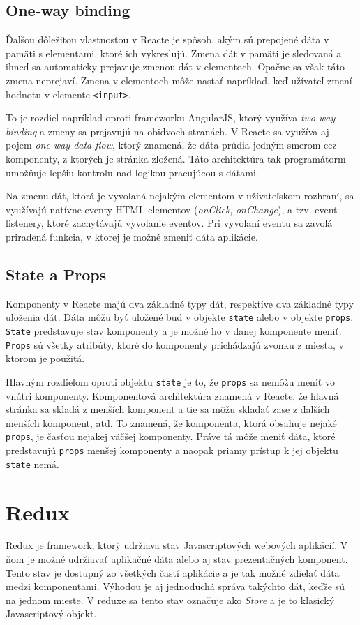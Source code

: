 \documentclass[
  digital, %
  table,   %
  lof,     %
  lot,     %
]{fithesis3}
\begin{document}
\subsection{One-way binding}
Ďalšou dôležitou vlastnosťou v Reacte je spôsob, akým sú prepojené dáta v pamäti s elementami, ktoré ich vykreslujú. Zmena dát v pamäti je sledovaná a ihneď sa automaticky prejavuje zmenou dát v elementoch. Opačne sa však táto zmena neprejaví. Zmena v elementoch môže nastať napríklad, keď užívateľ zmení hodnotu v elemente \texttt{<input>}.

To je rozdiel napríklad oproti frameworku AngularJS, ktorý využíva \textit{two-way binding} a zmeny sa prejavujú na obidvoch stranách. V Reacte sa využíva aj pojem \textit{one-way data flow}, ktorý znamená, že dáta prúdia jedným smerom cez komponenty, z ktorých je stránka zložená. Táto architektúra tak programátorm umožňuje lepšiu kontrolu nad logikou pracujúcou s dátami.

Na zmenu dát, ktorá je vyvolaná nejakým elementom v užívateľskom rozhraní, sa využívajú natívne eventy HTML elementov (\textit{onClick}, \textit{onChange}), a tzv. event-listenery, ktoré zachytávajú vyvolanie eventov. Pri vyvolaní eventu sa zavolá priradená funkcia, v ktorej je možné zmeniť dáta aplikácie.

\subsection{State a Props}
Komponenty v Reacte majú dva základné typy dát, respektíve dva základné typy uloženia dát. Dáta môžu byť uložené bud v objekte \texttt{state} alebo v objekte \texttt{props}. \texttt{State} predstavuje stav komponenty a je možné ho v danej komponente meniť. \texttt{Props} sú všetky atribúty, ktoré do komponenty prichádzajú zvonku z miesta, v ktorom je použitá.

Hlavným rozdielom oproti objektu \texttt{state} je to, že \texttt{props} sa nemôžu meniť vo vnútri komponenty. Komponentová architektúra znamená v Reacte, že hlavná stránka sa skladá z menších komponent a tie sa môžu skladať zase z ďalších menších komponent, atď. To znamená, že komponenta, ktorá obsahuje nejaké \texttt{props}, je časťou nejakej väčšej komponenty. Práve tá môže meniť dáta, ktoré predstavujú \texttt{props} menšej komponenty a naopak priamy prístup k jej objektu \texttt{state} nemá.

\section{Redux}
Redux je framework, ktorý udržiava stav Javascriptových webových aplikácií. V ňom je možné udržiavať aplikačné dáta alebo aj stav prezentačných komponent. Tento stav je dostupný zo všetkých častí aplikácie a je tak možné zdielať dáta medzi komponentami. Výhodou je aj jednoduchá správa takýchto dát, keďže sú na jednom mieste. V reduxe sa tento stav označuje ako \textit{Store} a je to klasický Javascriptový objekt.
\end{document}
